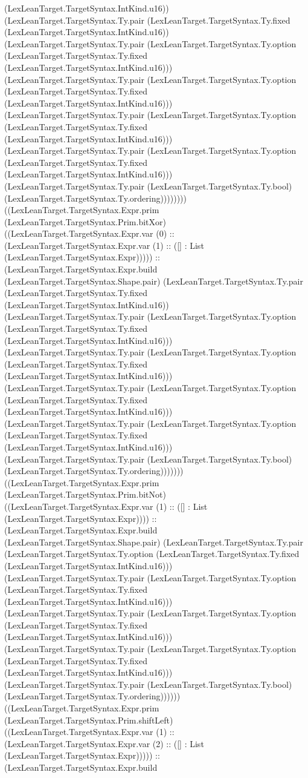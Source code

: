 \documentclass[11pt]{article}
\begin{document}
(LexLeanTarget.TargetSyntax.IntKind.u16)) (LexLeanTarget.TargetSyntax.Ty.pair (LexLeanTarget.TargetSyntax.Ty.fixed (LexLeanTarget.TargetSyntax.IntKind.u16)) (LexLeanTarget.TargetSyntax.Ty.pair (LexLeanTarget.TargetSyntax.Ty.option (LexLeanTarget.TargetSyntax.Ty.fixed (LexLeanTarget.TargetSyntax.IntKind.u16))) (LexLeanTarget.TargetSyntax.Ty.pair (LexLeanTarget.TargetSyntax.Ty.option (LexLeanTarget.TargetSyntax.Ty.fixed (LexLeanTarget.TargetSyntax.IntKind.u16))) (LexLeanTarget.TargetSyntax.Ty.pair (LexLeanTarget.TargetSyntax.Ty.option (LexLeanTarget.TargetSyntax.Ty.fixed (LexLeanTarget.TargetSyntax.IntKind.u16))) (LexLeanTarget.TargetSyntax.Ty.pair (LexLeanTarget.TargetSyntax.Ty.option (LexLeanTarget.TargetSyntax.Ty.fixed (LexLeanTarget.TargetSyntax.IntKind.u16))) (LexLeanTarget.TargetSyntax.Ty.pair (LexLeanTarget.TargetSyntax.Ty.bool) (LexLeanTarget.TargetSyntax.Ty.ordering)))))))) ((LexLeanTarget.TargetSyntax.Expr.prim (LexLeanTarget.TargetSyntax.Prim.bitXor) ((LexLeanTarget.TargetSyntax.Expr.var (0) :: (LexLeanTarget.TargetSyntax.Expr.var (1) :: ([] : List (LexLeanTarget.TargetSyntax.Expr))))) :: (LexLeanTarget.TargetSyntax.Expr.build (LexLeanTarget.TargetSyntax.Shape.pair) (LexLeanTarget.TargetSyntax.Ty.pair (LexLeanTarget.TargetSyntax.Ty.fixed (LexLeanTarget.TargetSyntax.IntKind.u16)) (LexLeanTarget.TargetSyntax.Ty.pair (LexLeanTarget.TargetSyntax.Ty.option (LexLeanTarget.TargetSyntax.Ty.fixed (LexLeanTarget.TargetSyntax.IntKind.u16))) (LexLeanTarget.TargetSyntax.Ty.pair (LexLeanTarget.TargetSyntax.Ty.option (LexLeanTarget.TargetSyntax.Ty.fixed (LexLeanTarget.TargetSyntax.IntKind.u16))) (LexLeanTarget.TargetSyntax.Ty.pair (LexLeanTarget.TargetSyntax.Ty.option (LexLeanTarget.TargetSyntax.Ty.fixed (LexLeanTarget.TargetSyntax.IntKind.u16))) (LexLeanTarget.TargetSyntax.Ty.pair (LexLeanTarget.TargetSyntax.Ty.option (LexLeanTarget.TargetSyntax.Ty.fixed (LexLeanTarget.TargetSyntax.IntKind.u16))) (LexLeanTarget.TargetSyntax.Ty.pair (LexLeanTarget.TargetSyntax.Ty.bool) (LexLeanTarget.TargetSyntax.Ty.ordering))))))) ((LexLeanTarget.TargetSyntax.Expr.prim (LexLeanTarget.TargetSyntax.Prim.bitNot) ((LexLeanTarget.TargetSyntax.Expr.var (1) :: ([] : List (LexLeanTarget.TargetSyntax.Expr)))) :: (LexLeanTarget.TargetSyntax.Expr.build (LexLeanTarget.TargetSyntax.Shape.pair) (LexLeanTarget.TargetSyntax.Ty.pair (LexLeanTarget.TargetSyntax.Ty.option (LexLeanTarget.TargetSyntax.Ty.fixed (LexLeanTarget.TargetSyntax.IntKind.u16))) (LexLeanTarget.TargetSyntax.Ty.pair (LexLeanTarget.TargetSyntax.Ty.option (LexLeanTarget.TargetSyntax.Ty.fixed (LexLeanTarget.TargetSyntax.IntKind.u16))) (LexLeanTarget.TargetSyntax.Ty.pair (LexLeanTarget.TargetSyntax.Ty.option (LexLeanTarget.TargetSyntax.Ty.fixed (LexLeanTarget.TargetSyntax.IntKind.u16))) (LexLeanTarget.TargetSyntax.Ty.pair (LexLeanTarget.TargetSyntax.Ty.option (LexLeanTarget.TargetSyntax.Ty.fixed (LexLeanTarget.TargetSyntax.IntKind.u16))) (LexLeanTarget.TargetSyntax.Ty.pair (LexLeanTarget.TargetSyntax.Ty.bool) (LexLeanTarget.TargetSyntax.Ty.ordering)))))) ((LexLeanTarget.TargetSyntax.Expr.prim (LexLeanTarget.TargetSyntax.Prim.shiftLeft) ((LexLeanTarget.TargetSyntax.Expr.var (1) :: (LexLeanTarget.TargetSyntax.Expr.var (2) :: ([] : List (LexLeanTarget.TargetSyntax.Expr))))) :: (LexLeanTarget.TargetSyntax.Expr.build 
\end{document}
